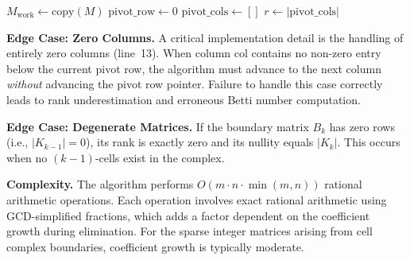 \documentclass[manuscript, nonacm, review=false]{acmart}
\theoremstyle{definition}
\theoremstyle{plain}
\newcommand{\Q}{\mathbb{Q}}
\begin{document}
\begin{algorithm}[H]
\caption{ExactRationalRREF$(M)$}
\label{alg:rref}
\KwIn{Matrix $M \in \Q^{m \times n}$}
\BlankLine
$M_{\text{work}} \leftarrow \text{copy}(M)$\;
$\text{pivot\_row} \leftarrow 0$\;
$\text{pivot\_cols} \leftarrow []$\;
$r \leftarrow |\text{pivot\_cols}|$\;
\;
\end{algorithm}

\textbf{Edge Case: Zero Columns.} A critical implementation detail is the handling of entirely zero columns (line~13). When column $\text{col}$ contains no non-zero entry below the current pivot row, the algorithm must advance to the next column \emph{without} advancing the pivot row pointer. Failure to handle this case correctly leads to rank underestimation and erroneous Betti number computation.

\textbf{Edge Case: Degenerate Matrices.} If the boundary matrix $B_k$ has zero rows (i.e., $|K_{k-1}| = 0$), its rank is exactly zero and its nullity equals $|K_k|$. This occurs when no $(k-1)$-cells exist in the complex.

\textbf{Complexity.} The algorithm performs $O(m \cdot n \cdot \min(m, n))$ rational arithmetic operations. Each operation involves exact rational arithmetic using GCD-simplified fractions, which adds a factor dependent on the coefficient growth during elimination. For the sparse integer matrices arising from cell complex boundaries, coefficient growth is typically moderate.
\end{document}
